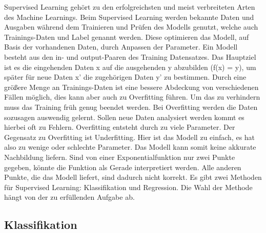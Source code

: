 	Supervised Learning gehört zu den erfolgreichsten und meist verbreiteten Arten des Machine Learnings. \cite{Mueller2016}
	Beim Supervised Learning werden bekannte Daten und Ausgaben während dem Trainieren und Prüfen des Modells genutzt, welche auch Trainings-Daten und Label genannt werden. \cite{Sarkar2018} Diese optimieren das Modell, auf Basis der vorhandenen Daten, durch Anpassen der Parameter. \cite{Suthaharan2016} Ein Modell besteht aus den in- und output-Paaren des Training Datensatzes. \cite{Mueller2016} Das Hauptziel ist es die eingehenden Daten x auf die ausgehenden y abzubilden (f(x) = y), um später für neue Daten x' die zugehörigen Daten y' zu bestimmen.\cite{Sarkar2018}
	Durch eine größere Menge an Trainings-Daten ist eine bessere Abdeckung von verschiedenen Fällen möglich, dies kann aber auch zu Overfitting führen. Um das zu verhindern muss das Training früh genug beendet werden. \cite{Suthaharan2016} Bei Overfitting werden die Daten sozusagen auswendig gelernt. Sollen neue Daten analysiert werden kommt es hierbei oft zu Fehlern. \cite{Kirk2014} Overfitting entsteht durch zu viele Parameter. Der Gegensatz zu Overfitting ist Underfitting. Hier ist das Modell zu einfach, es hat also zu wenige oder schlechte Parameter. \cite{Geron2017} Das Modell kann somit keine akkurate Nachbildung liefern. Sind von einer Exponentialfunktion nur zwei Punkte gegeben, könnte die Funktion als Gerade interpretiert werden. Alle anderen Punkte, die das Modell liefert, sind dadurch nicht korrekt. \cite{Kirk2014}
	Es gibt zwei Methoden für Supervised Learning: Klassifikation und Regression. Die Wahl der Methode hängt von der zu erfüllenden Aufgabe ab.\cite{Sarkar2018}
	
	\subsection{Klassifikation}
	
